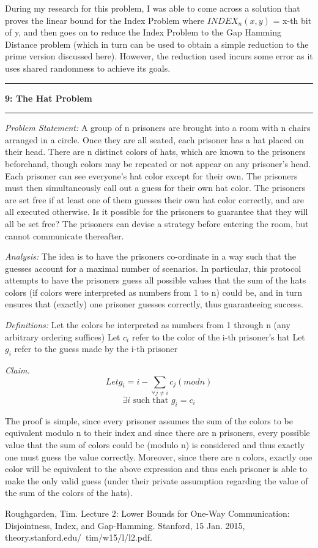 \documentclass[11pt]{article}
\newcommand\question[2]{\vspace{.25in}\hrule\textbf{#1: #2}\vspace{.5em}\hrule\vspace{.10in}}
\newcommand\analysis{\vspace{.10in}\emph{Analysis: }\newline}
\newcommand\problem{\emph{Problem Statement:}\newline}
\newcommand\definitions{\emph{Definitions:}\newline}
\newcommand\claim{\emph{Claim.}\newline}
\begin{document}
During my research for this problem, I was able to come across a solution that proves the linear bound for the Index Problem where $INDEX_n(x, y)$ = x-th bit of y, and then goes on to reduce the Index Problem to the Gap Hamming Distance problem (which in turn can be used to obtain a simple reduction to the prime version discussed here). However, the reduction used incurs some error as it uses shared randomness to achieve its goals. 
\newpage

\question{9}{The Hat Problem} 

\problem
A group of n prisoners are brought into a room with n chairs arranged
in a circle. Once they are all seated, each prisoner has a hat placed on their head. There
are n distinct colors of hats, which are known to the prisoners beforehand, though colors
may be repeated or not appear on any prisoner’s head. Each prisoner can see everyone’s hat
color except for their own. The prisoners must then simultaneously call out a guess for their
own hat color. The prisoners are set free if at least one of them guesses their own hat color
correctly, and are all executed otherwise. Is it possible for the prisoners to guarantee that
they will all be set free? The prisoners can devise a strategy before entering the room, but
cannot communicate thereafter.

\analysis
The idea is to have the prisoners co-ordinate in a way such that the guesses account for a maximal number of scenarios. In particular, this protocol attempts to have the prisoners guess all possible values that the sum of the hats colors (if colors were interpreted as numbers from 1 to n) could be, and in turn ensures that (exactly) one prisoner guesses correctly, thus guaranteeing success.
\newline

\definitions
Let the colors be interpreted as numbers from 1 through n (any arbitrary ordering suffices)\newline
Let $c_i$ refer to the color of the i-th prisoner's hat \newline
Let $g_i$ refer to the guess made by the i-th prisoner \newline
\newline

\claim
$$ Let g_i = i - \sum_{\forall j \neq i}{c_j} (mod n) $$
$$ \exists i \text{ such that } g_i = c_i $$
\newline

\proof 
The proof is simple, since every prisoner assumes the sum of the colors to be equivalent modulo n to their index and since there are n prisoners, every possible value that the sum of colors could be (modulo n) is considered and thus exactly one must guess the value correctly. Moreover, since there are n colors, exactly one color will be equivalent to the above expression and thus each prisoner is able to make the only valid guess (under their private assumption regarding the value of the sum of the colors of the hats). 

\newpage

\begin{thebibliography}{1}
\bibitem{} Roughgarden, Tim. Lecture 2: Lower Bounds for One-Way Communication: Disjointness, Index, and Gap-Hamming. Stanford, 15 Jan. 2015, theory.stanford.edu/~tim/w15/l/l2.pdf.
\end{thebibliography}
\end{document}

